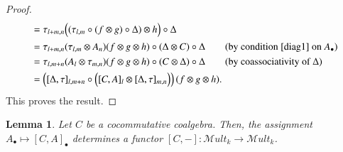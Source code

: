 \documentclass[10pt, colorlinks]{article}
\numberwithin{equation}{section} \DeclareMathSizes{2}{10}{12}{13}
\newtheorem{lem}[thm]{Lemma}
\begin{document}
\begin{proof}
\begin{align*}
            &=\tau_{l+m,n} \Big((\tau_{l,m}\circ (f\otimes g)\circ \Delta)\otimes h\Big)\circ \Delta\\
            &= \tau_{l+m,n}(\tau_{l,m}\otimes A_n)(f\otimes g\otimes h)\circ (\Delta\otimes C)\circ \Delta \tag{by condition \eqref{diag1} on $A_\bullet$}\\
            &=\tau_{l,m+n}(A_l\otimes\tau_{m,n})(f\otimes g\otimes h)\circ(C\otimes \Delta)\circ \Delta\tag{by coassociativity of $\Delta$}\\
            &=\left([\Delta,\tau]_{l,m+n}\circ\Big(  [C, A]_l\otimes[\Delta,\tau]_{m,n}\Big)\right)(f\otimes g\otimes h).
        \end{align*}
        This proves the result.
    \end{proof}
    \smallskip

     
     \begin{lem}
       Let $C$ be a cocommutative coalgebra. Then, the  assignment
        $
             A_\bullet\longmapsto[C,A]_\bullet$ determines a functor $[C,-]:\mathscr Mult_k\longrightarrow \mathscr Mult_k$.
     \end{lem}
\end{document}
